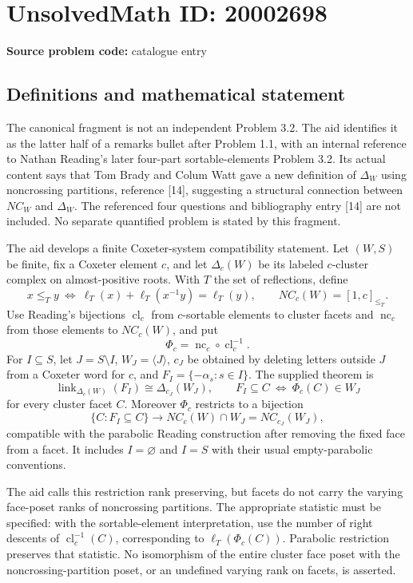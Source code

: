 \documentclass[11pt]{article}
\begin{document}
\section*{UnsolvedMath ID: 20002698}
\textbf{Source problem code:} catalogue entry
\subsection{Definitions and mathematical statement}
The canonical fragment is not an independent Problem 3.2. The aid identifies it as the latter half of a remarks bullet after Problem 1.1, with an internal reference to Nathan Reading's later four-part sortable-elements Problem 3.2. Its actual content says that Tom Brady and Colum Watt gave a new definition of $\Delta_W$ using noncrossing partitions, reference [14], suggesting a structural connection between $NC_W$ and $\Delta_W$. The referenced four questions and bibliography entry [14] are not included. No separate quantified problem is stated by this fragment.

The aid develops a finite Coxeter-system compatibility statement. Let $(W,S)$ be finite, fix a Coxeter element $c$, and let $\Delta_c(W)$ be its labeled $c$-cluster complex on almost-positive roots. With $T$ the set of reflections, define
\[
x\leq_Ty\ \Longleftrightarrow\ \ell_T(x)+\ell_T(x^{-1}y)=\ell_T(y),\qquad
NC_c(W)=[1,c]_{\leq_T}.
\]
Use Reading's bijections $\operatorname{cl}_c$ from $c$-sortable elements to cluster facets and $\operatorname{nc}_c$ from those elements to $NC_c(W)$, and put
\[
\Phi_c=\operatorname{nc}_c\circ\operatorname{cl}_c^{-1}.
\]
For $I\subseteq S$, let $J=S\setminus I$, $W_J=\langle J\rangle$, $c_J$ be obtained by deleting letters outside $J$ from a Coxeter word for $c$, and $F_I=\{-\alpha_s:s\in I\}$. The supplied theorem is
\[
\operatorname{link}_{\Delta_c(W)}(F_I)\cong\Delta_{c_J}(W_J),
\qquad
F_I\subseteq C\ \Longleftrightarrow\ \Phi_c(C)\in W_J
\]
for every cluster facet $C$. Moreover $\Phi_c$ restricts to a bijection
\[
\{C:F_I\subseteq C\}\longrightarrow
NC_c(W)\cap W_J=NC_{c_J}(W_J),
\]
compatible with the parabolic Reading construction after removing the fixed face from a facet. It includes $I=\varnothing$ and $I=S$ with their usual empty-parabolic conventions.

The aid calls this restriction rank preserving, but facets do not carry the varying face-poset ranks of noncrossing partitions. The appropriate statistic must be specified: with the sortable-element interpretation, use the number of right descents of $\operatorname{cl}_c^{-1}(C)$, corresponding to $\ell_T(\Phi_c(C))$. Parabolic restriction preserves that statistic. No isomorphism of the entire cluster face poset with the noncrossing-partition poset, or an undefined varying rank on facets, is asserted.
\end{document}
